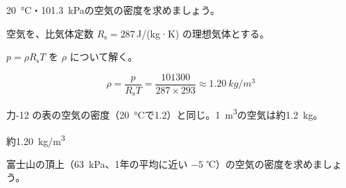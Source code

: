 \begin{reidai}[空気の密度]
\label{ph:熱-3:ex4}\qty{20}{\celsius}・\qty{101.3}{kPa}の空気の密度を求めましょう。
\par{} 空気を、比気体定数 $R_{\mathrm s}=287$\,J/(kg·K) の理想気体とする。
\par\kangaekata $p=\rho R_{\mathrm s}T$ を $\rho$ について解く。
\par\shiki
\[ \rho=\frac{p}{R_{\mathrm s}T}=\frac{\num{101300}}{287\times293}\approx\qty{1.20}{kg/m^3} \]
\par{} 力-12 の表の空気の密度（\qty{20}{\celsius}で1.2）と同じ。\qty{1}{m^3}の空気は約\qty{1.2}{kg}。
\par\kotae 約\qty{1.20}{kg/m^3}
\end{reidai}
\begin{jibun}
富士山の頂上（\qty{63}{kPa}、1年の平均に近い $-5$ ℃）の空気の密度を求めましょう。
\end{jibun}


